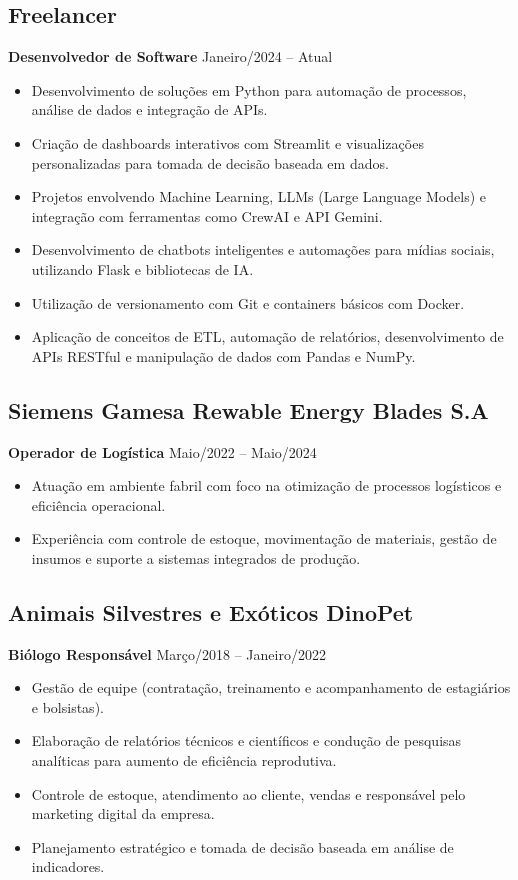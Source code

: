 \documentclass[a4paper,10pt]{article} %
\begin{document}
\subsection*{Freelancer} %
\textbf{Desenvolvedor de Software} \hfill Janeiro/2024 – Atual %
\begin{itemize}
    \item Desenvolvimento de soluções em Python para automação de processos, análise de dados e integração de APIs.
    \item Criação de dashboards interativos com Streamlit e visualizações personalizadas para tomada de decisão baseada em dados.
    \item Projetos envolvendo Machine Learning, LLMs (Large Language Models) e integração com ferramentas como CrewAI e API Gemini.
    \item Desenvolvimento de chatbots inteligentes e automações para mídias sociais, utilizando Flask e bibliotecas de IA.
    \item Utilização de versionamento com Git e containers básicos com Docker.
    \item Aplicação de conceitos de ETL, automação de relatórios, desenvolvimento de APIs RESTful e manipulação de dados com Pandas e NumPy.
\end{itemize}

\subsection*{Siemens Gamesa Rewable Energy Blades S.A}
\textbf{Operador de Logística} \hfill Maio/2022 – Maio/2024
\begin{itemize}
    \item Atuação em ambiente fabril com foco na otimização de processos logísticos e eficiência operacional.
    \item Experiência com controle de estoque, movimentação de materiais, gestão de insumos e suporte a sistemas integrados de produção.
\end{itemize}

\subsection*{Animais Silvestres e Exóticos DinoPet}
\textbf{Biólogo Responsável} \hfill Março/2018 – Janeiro/2022
\begin{itemize}
    \item Gestão de equipe (contratação, treinamento e acompanhamento de estagiários e bolsistas).
    \item Elaboração de relatórios técnicos e científicos e condução de pesquisas analíticas para aumento de eficiência reprodutiva.
    \item Controle de estoque, atendimento ao cliente, vendas e responsável pelo marketing digital da empresa.
    \item Planejamento estratégico e tomada de decisão baseada em análise de indicadores.
\end{itemize}
\end{document}
